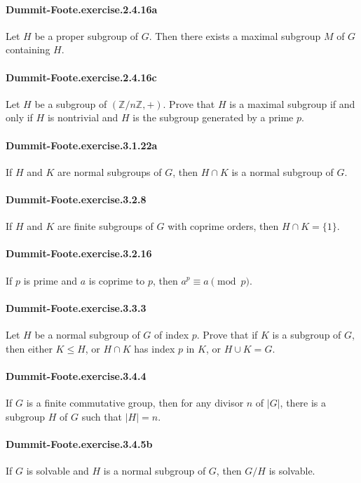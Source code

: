 \documentclass{article}
\begin{document}
\paragraph{Dummit-Foote.exercise.2.4.16a} Let $H$ be a proper subgroup of $G$. Then there exists a maximal subgroup $M$ of $G$ containing $H$.

\paragraph{Dummit-Foote.exercise.2.4.16c} Let $H$ be a subgroup of $(\mathbb{Z}/n\mathbb{Z}, +)$. Prove that $H$ is a maximal subgroup if and only if $H$ is nontrivial and $H$ is the subgroup generated by a prime $p$.

\paragraph{Dummit-Foote.exercise.3.1.22a} If $H$ and $K$ are normal subgroups of $G$, then $H\cap K$ is a normal subgroup of $G$.

\paragraph{Dummit-Foote.exercise.3.2.8} If $H$ and $K$ are finite subgroups of $G$ with coprime orders, then $H\cap K = \{1\}$.

\paragraph{Dummit-Foote.exercise.3.2.16} If $p$ is prime and $a$ is coprime to $p$, then $a^p\equiv a\pmod{p}$.

\paragraph{Dummit-Foote.exercise.3.3.3} Let $H$ be a normal subgroup of $G$ of index $p$. Prove that if $K$ is a subgroup of $G$, then either $K\leq H$, or $H\cap K$ has index $p$ in $K$, or $H\cup K=G$.

\paragraph{Dummit-Foote.exercise.3.4.4} If $G$ is a finite commutative group, then for any divisor $n$ of $|G|$, there is a subgroup $H$ of $G$ such that $|H|=n$.

\paragraph{Dummit-Foote.exercise.3.4.5b} If $G$ is solvable and $H$ is a normal subgroup of $G$, then $G/H$ is solvable.
\end{document}
